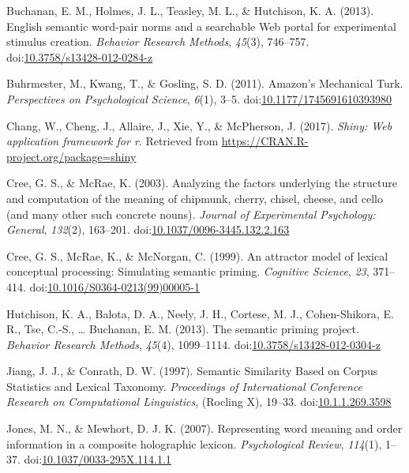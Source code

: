 \documentclass[english,man]{apa6}
\theoremstyle{definition}
\theoremstyle{definition}
\theoremstyle{definition}
\theoremstyle{remark}
\begin{document}
\hypertarget{ref-Buchanan2013}{}
Buchanan, E. M., Holmes, J. L., Teasley, M. L., \& Hutchison, K. A.
(2013). English semantic word-pair norms and a searchable Web portal for
experimental stimulus creation. \emph{Behavior Research Methods},
\emph{45}(3), 746--757.
doi:\href{https://doi.org/10.3758/s13428-012-0284-z}{10.3758/s13428-012-0284-z}

\hypertarget{ref-Buhrmester2011}{}
Buhrmester, M., Kwang, T., \& Gosling, S. D. (2011). Amazon's Mechanical
Turk. \emph{Perspectives on Psychological Science}, \emph{6}(1), 3--5.
doi:\href{https://doi.org/10.1177/1745691610393980}{10.1177/1745691610393980}

\hypertarget{ref-R-shiny}{}
Chang, W., Cheng, J., Allaire, J., Xie, Y., \& McPherson, J. (2017).
\emph{Shiny: Web application framework for r}. Retrieved from
\url{https://CRAN.R-project.org/package=shiny}

\hypertarget{ref-Cree2003}{}
Cree, G. S., \& McRae, K. (2003). Analyzing the factors underlying the
structure and computation of the meaning of chipmunk, cherry, chisel,
cheese, and cello (and many other such concrete nouns). \emph{Journal of
Experimental Psychology: General}, \emph{132}(2), 163--201.
doi:\href{https://doi.org/10.1037/0096-3445.132.2.163}{10.1037/0096-3445.132.2.163}

\hypertarget{ref-Cree1999}{}
Cree, G. S., McRae, K., \& McNorgan, C. (1999). An attractor model of
lexical conceptual processing: Simulating semantic priming.
\emph{Cognitive Science}, \emph{23}, 371--414.
doi:\href{https://doi.org/10.1016/S0364-0213(99)00005-1}{10.1016/S0364-0213(99)00005-1}

\hypertarget{ref-Hutchison2013}{}
Hutchison, K. A., Balota, D. A., Neely, J. H., Cortese, M. J.,
Cohen-Shikora, E. R., Tse, C.-S., \ldots{} Buchanan, E. M. (2013). The
semantic priming project. \emph{Behavior Research Methods},
\emph{45}(4), 1099--1114.
doi:\href{https://doi.org/10.3758/s13428-012-0304-z}{10.3758/s13428-012-0304-z}

\hypertarget{ref-Jiang1997}{}
Jiang, J. J., \& Conrath, D. W. (1997). Semantic Similarity Based on
Corpus Statistics and Lexical Taxonomy. \emph{Proceedings of
International Conference Research on Computational Linguistics},
(Rocling X), 19--33.
doi:\href{https://doi.org/10.1.1.269.3598}{10.1.1.269.3598}

\hypertarget{ref-Jones2007}{}
Jones, M. N., \& Mewhort, D. J. K. (2007). Representing word meaning and
order information in a composite holographic lexicon.
\emph{Psychological Review}, \emph{114}(1), 1--37.
doi:\href{https://doi.org/10.1037/0033-295X.114.1.1}{10.1037/0033-295X.114.1.1}
\end{document}
